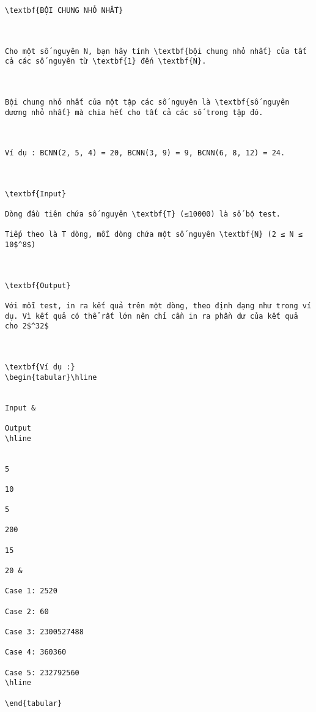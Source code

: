 
\begin{verbatim}



\textbf{BỘI CHUNG NHỎ NHẤT}

 

Cho một số nguyên N, bạn hãy tính \textbf{bội chung nhỏ nhất} của tất cả các số nguyên từ \textbf{1} đến \textbf{N}.

 

Bội chung nhỏ nhất của một tập các số nguyên là \textbf{số nguyên dương nhỏ nhất} mà chia hết cho tất cả các số trong tập đó.

 

Ví dụ : BCNN(2, 5, 4) = 20, BCNN(3, 9) = 9, BCNN(6, 8, 12) = 24.

 

\textbf{Input}

Dòng đầu tiên chứa số nguyên \textbf{T} (≤10000) là số bộ test.

Tiếp theo là T dòng, mỗi dòng chứa một số nguyên \textbf{N} (2 ≤ N ≤ 10$^8$)

 

\textbf{Output}

Với mỗi test, in ra kết quả trên một dòng, theo định dạng như trong ví dụ. Vì kết quả có thể rất lớn nên chỉ cần in ra phần dư của kết quả cho 2$^32$

 

\textbf{Ví dụ :}
\begin{tabular}\hline 


Input & 

Output  
\hline


5

10

5

200

15

20 & 

Case 1: 2520

Case 2: 60

Case 3: 2300527488

Case 4: 360360

Case 5: 232792560  
\hline

\end{tabular}

 \end{verbatim}
